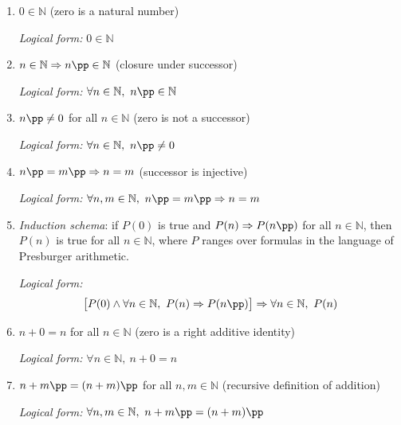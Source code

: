 
\begin{tcolorbox}[colback=propbox, colframe=propborder, arc=2pt,
  left=6pt, right=6pt, top=4pt, bottom=4pt,
  title={\small\textbf{Presburger Arithmetic}},
  fonttitle=\small\bfseries]
\begin{enumerate}
  \item[\textbf{Pr1.}] $0 \in \mathbb{N}$
    \quad (zero is a natural number)

    \textit{Logical form:} $0 \in \mathbb{N}$

  \item[\textbf{Pr2.}] $n \in \mathbb{N} \Rightarrow n\pp \in \mathbb{N}$
    \quad (closure under successor)

    \textit{Logical form:} $\forall n \in \mathbb{N},\ n\pp \in \mathbb{N}$

  \item[\textbf{Pr3.}] $n\pp \neq 0$ for all $n \in \mathbb{N}$
    \quad (zero is not a successor)

    \textit{Logical form:} $\forall n \in \mathbb{N},\ n\pp \neq 0$

  \item[\textbf{Pr4.}] $n\pp = m\pp \Rightarrow n = m$
    \quad (successor is injective)

    \textit{Logical form:} $\forall n,m \in \mathbb{N},\ n\pp = m\pp \Rightarrow n = m$

  \item[\textbf{Pr5.}] \emph{Induction schema}: if $P(0)$ is true and
    $P(n) \Rightarrow P(n\pp)$ for all $n \in \mathbb{N}$,
    then $P(n)$ is true for all $n \in \mathbb{N}$,
    where $P$ ranges over formulas in the language of
    Presburger arithmetic.

    \textit{Logical form:}
    \[
    \bigl[P(0) \wedge \forall n \in \mathbb{N},\ P(n) \Rightarrow P(n\pp)\bigr]
    \Rightarrow \forall n \in \mathbb{N},\ P(n)
    \]

  \item[\textbf{Pr6.}] $n + 0 = n$ for all $n \in \mathbb{N}$
    \quad (zero is a right additive identity)

    \textit{Logical form:} $\forall n \in \mathbb{N},\ n + 0 = n$

  \item[\textbf{Pr7.}] $n + m\pp = (n + m)\pp$ for all $n,m \in \mathbb{N}$
    \quad (recursive definition of addition)

    \textit{Logical form:}
    $\forall n,m \in \mathbb{N},\ n + m\pp = (n + m)\pp$
\end{enumerate}
\end{tcolorbox}


